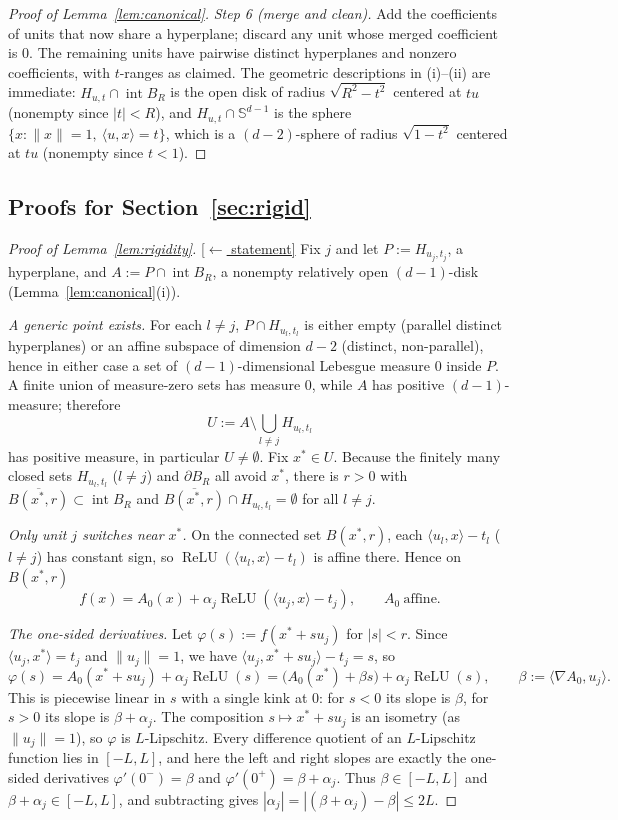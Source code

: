 \documentclass[11pt,reqno]{amsart}
\theoremstyle{plain}
\theoremstyle{definition}
\theoremstyle{remark}
\newcommand{\Sd}{\mathbb{S}^{d-1}}
\newcommand{\relu}{\operatorname{ReLU}}
\newcommand{\inn}[2]{\langle #1,#2\rangle}
\newcommand{\stmtbutton}[1]{\hyperref[#1]{\textnormal{\footnotesize\textsf{[$\leftarrow$ statement]}}}}
\begin{document}
\begin{proof}[Proof of Lemma~\textup{\ref{lem:canonical}}]
\emph{Step 6 (merge and clean).} Add the coefficients of units that now share a hyperplane; discard any unit whose merged coefficient is $0$. The remaining units have pairwise distinct hyperplanes and nonzero coefficients, with $t$-ranges as claimed. The geometric descriptions in (i)--(ii) are immediate: $H_{u,t}\cap\operatorname{int}B_R$ is the open disk of radius $\sqrt{R^2-t^2}$ centered at $tu$ (nonempty since $|t|<R$), and $H_{u,t}\cap\Sd$ is the sphere $\{x:\|x\|=1,\ \inn{u}{x}=t\}$, which is a $(d-2)$-sphere of radius $\sqrt{1-t^2}$ centered at $tu$ (nonempty since $t<1$).
\end{proof}

\subsection{Proofs for Section~\ref{sec:rigid}}

\begin{proof}[Proof of Lemma~\textup{\ref{lem:rigidity}}]\label{proof:rigidity}\stmtbutton{lem:rigidity}
Fix $j$ and let $P:=H_{u_j,t_j}$, a hyperplane, and $A:=P\cap\operatorname{int}B_R$, a nonempty relatively open $(d-1)$-disk (Lemma~\ref{lem:canonical}(i)).

\emph{A generic point exists.} For each $l\ne j$, $P\cap H_{u_l,t_l}$ is either empty (parallel distinct hyperplanes) or an affine subspace of dimension $d-2$ (distinct, non-parallel), hence in either case a set of $(d-1)$-dimensional Lebesgue measure $0$ inside $P$. A finite union of measure-zero sets has measure $0$, while $A$ has positive $(d-1)$-measure; therefore
\[
U:=A\setminus\bigcup_{l\ne j}H_{u_l,t_l}
\]
has positive measure, in particular $U\ne\emptyset$. Fix $x^*\in U$. Because the finitely many closed sets $H_{u_l,t_l}$ ($l\ne j$) and $\partial B_R$ all avoid $x^*$, there is $r>0$ with $\overline{B(x^*,r)}\subset\operatorname{int}B_R$ and $\overline{B(x^*,r)}\cap H_{u_l,t_l}=\emptyset$ for all $l\ne j$.

\emph{Only unit $j$ switches near $x^*$.} On the connected set $B(x^*,r)$, each $\inn{u_l}{x}-t_l$ ($l\ne j$) has constant sign, so $\relu(\inn{u_l}{x}-t_l)$ is affine there. Hence on $B(x^*,r)$
\[
f(x)=A_0(x)+\alpha_j\relu(\inn{u_j}{x}-t_j),\qquad A_0\ \text{affine.}
\]

\emph{The one-sided derivatives.} Let $\varphi(s):=f(x^*+su_j)$ for $|s|<r$. Since $\inn{u_j}{x^*}=t_j$ and $\|u_j\|=1$, we have $\inn{u_j}{x^*+su_j}-t_j=s$, so
\[
\varphi(s)=A_0(x^*+su_j)+\alpha_j\relu(s)=\bigl(A_0(x^*)+\beta s\bigr)+\alpha_j\relu(s),\qquad \beta:=\inn{\nabla A_0}{u_j}.
\]
This is piecewise linear in $s$ with a single kink at $0$: for $s<0$ its slope is $\beta$, for $s>0$ its slope is $\beta+\alpha_j$. The composition $s\mapsto x^*+su_j$ is an isometry (as $\|u_j\|=1$), so $\varphi$ is $L$-Lipschitz. Every difference quotient of an $L$-Lipschitz function lies in $[-L,L]$, and here the left and right slopes are exactly the one-sided derivatives $\varphi'(0^-)=\beta$ and $\varphi'(0^+)=\beta+\alpha_j$. Thus $\beta\in[-L,L]$ and $\beta+\alpha_j\in[-L,L]$, and subtracting gives $|\alpha_j|=|(\beta+\alpha_j)-\beta|\le2L$.
\end{proof}
\end{document}
